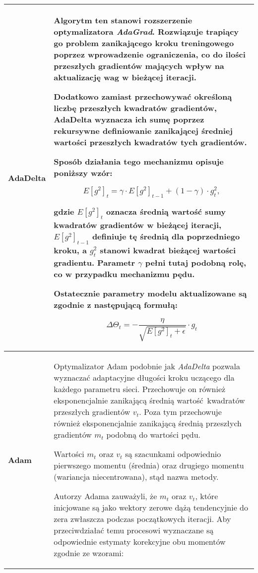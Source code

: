 \begin{enumerate}
\begin{longtable}{ |m{3cm}|m{10cm}| }
     \hline
       \textbf{AdaDelta \cite{Adadelta}} &

       Algorytm ten stanowi rozszerzenie optymalizatora \textit{AdaGrad}. Rozwiązuje
       trapiący go problem zanikającego kroku treningowego poprzez wprowadzenie
       ograniczenia, co do ilości przeszłych gradientów mających wpływ na aktualizację
       wag w bieżącej iteracji.

       Dodatkowo zamiast przechowywać określoną liczbę przeszłych kwadratów gradientów,
       AdaDelta wyznacza ich sumę poprzez rekursywne definiowanie zanikającej
       średniej wartości przeszłych kwadratów tych gradientów.

       Sposób działania tego mechanizmu opisuje poniższy wzór:

       \[E[g^2]_t = \gamma \cdot E[g^2]_{t-1} + (1 - \gamma) \cdot g^2_t,\]

       gdzie $E[g^2]_t$ oznacza średnią wartość sumy kwadratów gradientów w bieżącej
       iteracji, $E[g^2]_{t-1}$ definiuje tę średnią dla poprzedniego kroku, a
       $g^2_t$ stanowi kwadrat bieżącej wartości gradientu. Parametr $\gamma$
       pełni tutaj podobną rolę, co w przypadku mechanizmu pędu.

       Ostatecznie parametry modelu aktualizowane są zgodnie z następującą formułą:

       \[\Delta \Theta_t = -\frac{\eta}{\sqrt{E[g^2]_t + \epsilon}} \cdot g_t\] \\

     \hline
       \textbf{Adam \cite{Adam}} &

       Optymalizator Adam podobnie jak \textit{AdaDelta} pozwala wyznaczać adaptacyjne długości
       kroku uczącego dla każdego parametru sieci. Przechowuje on również
       eksponencjalnie zanikającą średnią wartość kwadratów przeszłych gradientów $v_t$.
       Poza tym przechowuje również eksponencjalnie zanikającą średnią
       przeszłych gradientów $m_t$ podobną do wartości pędu.

       Wartości $m_t$ oraz $v_t$ są szacunkami odpowiednio pierwszego momentu
       (średnia) oraz drugiego momentu (wariancja niecentrowana), stąd nazwa metody.

       Autorzy Adama zauważyli, że $m_t$ oraz $v_t$, które inicjowane są jako
       wektory zerowe dążą tendencyjnie do zera zwłaszcza podczas początkowych
       iteracji. Aby przeciwdziałać temu procesowi wyznaczane są odpowiednie
       estymaty korekcyjne obu momentów zgodnie ze wzorami:


\end{longtable}
\end{enumerate}
